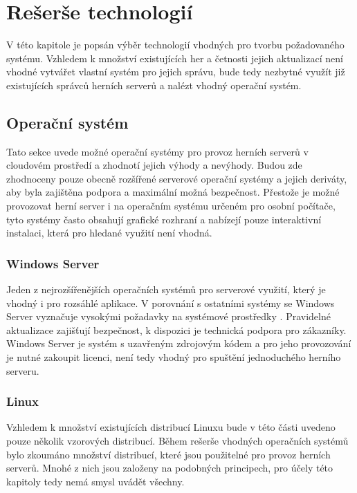 \chapter{Rešerše technologií}

V této kapitole je popsán výběr technologií vhodných pro tvorbu požadovaného systému.
Vzhledem k množství existujících her a četnosti jejich aktualizací není vhodné vytvářet vlastní
systém pro jejich správu, bude tedy nezbytné využít již existujících správců herních serverů a nalézt vhodný
operační systém.

\section{Operační systém}

Tato sekce uvede možné operační systémy pro provoz herních serverů v cloudovém prostředí a zhodnotí
jejich výhody a nevýhody. Budou zde zhodnoceny pouze obecně rozšířené serverové operační systémy \cite{server_os_share} a jejich deriváty,
aby byla zajištěna podpora a maximální možná bezpečnost. Přestože je možné provozovat herní server i na operačním systému
určeném pro osobní počítače, tyto systémy často obsahují grafické rozhraní a nabízejí pouze interaktivní instalaci, která
pro hledané využití není vhodná.

\subsection{Windows Server}

Jeden z nejrozšířenějších operačních systémů pro serverové využití, který je vhodný i pro rozsáhlé aplikace.
V porovnání s ostatními systémy se Windows Server vyznačuje vysokými požadavky na
systémové prostředky \cite{windows_server_reqs}. Pravidelné aktualizace zajišťují bezpečnost, k dispozici je technická
podpora pro zákazníky. Windows Server je systém s uzavřeným zdrojovým kódem a pro jeho provozování je nutné zakoupit licenci,
není tedy vhodný pro spuštění jednoduchého herního serveru.

\subsection{Linux}

Vzhledem k množství existujících distribucí Linuxu bude v této části uvedeno pouze několik vzorových distribucí.
Během rešerše vhodných operačních systémů bylo zkoumáno množství distribucí, které jsou použitelné pro provoz
herních serverů. Mnohé z nich jsou založeny na podobných principech, pro účely této kapitoly tedy nemá smysl uvádět všechny.

